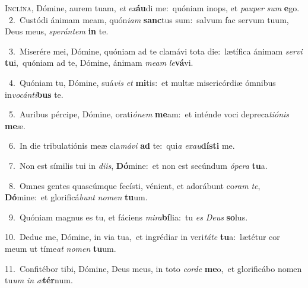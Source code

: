 \lettrine{\initial\textcolor{\initialcolor}{I}}{nclína,} Dómine, aurem tuam, \textit{et} \textit{ex}\-\textbf{áu}di me:~\star quóniam inops, et \textit{pau}\-\textit{per} \textit{sum} \textbf{e}\-go.\\
{\numbfont\textcolor{\numbcolor}{~2.}}~Custódi ánimam meam, quón\-\textit{i}\-\textit{am} \textbf{sanc}\-tus sum:~\star salvum fac servum tuum, Deus meus, \textit{spe}\-\textit{rán}\textit{tem} \textbf{in} te.\par
{\numbfont\textcolor{\numbcolor}{~3.}}~Miserére mei, Dómine, quóniam ad te clamávi tota die:~\dagger lætífica ánimam \textit{ser}\-\textit{vi} \textbf{tu}\-i,~\star quóniam ad te, Dómine, ánimam \textit{me}\-\textit{am} \textit{le}\-\textbf{vá}vi.\par
{\numbfont\textcolor{\numbcolor}{~4.}}~Quóniam tu, Dómine, suá\textit{vis} \textit{et} \textbf{mi}\-tis:~\star et multæ misericórdiæ ómnibus in\-\textit{vo}\-\textit{cán}\textit{ti}\textbf{bus} te.\par
{\numbfont\textcolor{\numbcolor}{~5.}}~Auribus pércipe, Dómine, orati\-\textit{ó}\-\textit{nem} \textbf{me}\-am:~\star et inténde voci depreca\-\textit{ti}\-\textit{ó}\textit{nis} \textbf{me}\-æ.\par
{\numbfont\textcolor{\numbcolor}{~6.}}~In die tribulatiónis meæ cla\-\textit{má}\-\textit{vi} \textbf{ad} te:~\star qui\textit{a} \textit{ex}\-\textit{au}\textbf{dís}\textbf{ti} me.\par
{\numbfont\textcolor{\numbcolor}{~7.}}~Non est símilis tui in \textit{di}\-\textit{is}, \textbf{Dó}\-mine:~\star et non est secúndum \textit{ó}\-\textit{pe}\textit{ra} \textbf{tu}\-a.\par
{\numbfont\textcolor{\numbcolor}{~8.}}~Omnes gentes quascúmque fecísti, vénient, et adorábunt co\textit{ram} \textit{te}\-, \textbf{Dó}\-mine:~\star et glorificá\textit{bunt} \textit{no}\-\textit{men} \textbf{tu}\-um.\par
{\numbfont\textcolor{\numbcolor}{~9.}}~Quóniam magnus es tu, et fáciens \textit{mi}\-\textit{ra}\textbf{bí}lia:~\star tu \textit{es} \textit{De}\-\textit{us} \textbf{so}\-lus.\par
{\numbfont\textcolor{\numbcolor}{10.}}~Deduc me, Dómine, in via tua,~\dagger et ingrédiar in veri\-\textit{tá}\-\textit{te} \textbf{tu}\-a:~\star lætétur cor meum ut tíme\textit{at} \textit{no}\-\textit{men} \textbf{tu}\-um.\par
{\numbfont\textcolor{\numbcolor}{11.}}~Confitébor tibi, Dómine, Deus meus, in toto \textit{cor}\-\textit{de} \textbf{me}\-o,~\star et glorificábo nomen tu\textit{um} \textit{in} \textit{æ}\-\textbf{tér}num.\par
